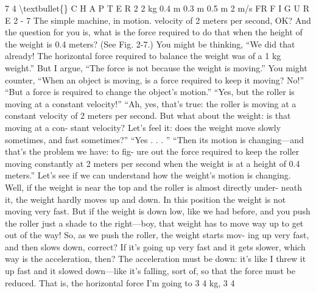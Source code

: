 \documentclass[10pt,oneside]{article}
\begin{document}
7 4 \textbackslash{}textbullet\{\} C H A P T E R  2 2 kg 0.4 m 0.3 m 0.5 m 2 m/s FR F I G U R E  2 - 7 The simple machine, in motion. velocity of 2 meters per second, OK? And the question for you is, what is the force required to do that when the height of the weight is 0.4 meters? (See Fig. 2-7.) You might be thinking, “We did that already! The horizontal force required to balance the weight was of a 1 kg weight.” But I argue, “The force is not because the weight is moving.” You might counter, “When an object is moving, is a force required to keep it moving? No!” “But a force is required to change the object’s motion.” “Yes, but the roller is moving at a constant velocity!” “Ah, yes, that’s true: the roller is moving at a constant velocity of 2 meters per second. But what about the weight: is that moving at a con- stant velocity? Let’s feel it: does the weight move slowly sometimes, and fast sometimes?” “Yes . . . ” “Then its motion is changing---and that’s the problem we have: to fig- ure out the force required to keep the roller moving constantly at 2 meters per second when the weight is at a height of 0.4 meters.” Let’s see if we can understand how the weight’s motion is changing. Well, if the weight is near the top and the roller is almost directly under- neath it, the weight hardly moves up and down. In this position the weight is not moving very fast. But if the weight is down low, like we had before, and you push the roller just a shade to the right---boy, that weight has to move way up to get out of the way! So, as we push the roller, the weight starts mov- ing up very fast, and then slows down, correct? If it’s going up very fast and it gets slower, which way is the acceleration, then? The acceleration must be down: it’s like I threw it up fast and it slowed down---like it’s falling, sort of, so that the force must be reduced. That is, the horizontal force I’m going to 3 4 kg, 3 4\par
\end{document}
